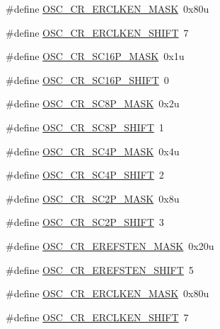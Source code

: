 \begin{DoxyCompactItemize}
\#define \hyperlink{group___o_s_c___register___masks_gab96140627de270278cbdfc81fbef63fc}{O\+S\+C\+\_\+\+C\+R\+\_\+\+E\+R\+C\+L\+K\+E\+N\+\_\+\+M\+A\+SK}~0x80u
\item 
\#define \hyperlink{group___o_s_c___register___masks_ga56f4aa6f215268327accda5434671187}{O\+S\+C\+\_\+\+C\+R\+\_\+\+E\+R\+C\+L\+K\+E\+N\+\_\+\+S\+H\+I\+FT}~7
\item 
\#define \hyperlink{group___o_s_c___register___masks_ga8c73f0e22875a434f8031986a9e5f8b4}{O\+S\+C\+\_\+\+C\+R\+\_\+\+S\+C16\+P\+\_\+\+M\+A\+SK}~0x1u
\item 
\#define \hyperlink{group___o_s_c___register___masks_ga4bcf6535cd7e7c4ff935f6b544ca3f9a}{O\+S\+C\+\_\+\+C\+R\+\_\+\+S\+C16\+P\+\_\+\+S\+H\+I\+FT}~0
\item 
\#define \hyperlink{group___o_s_c___register___masks_ga1a5a0db08efaf66c34caf98136cbec11}{O\+S\+C\+\_\+\+C\+R\+\_\+\+S\+C8\+P\+\_\+\+M\+A\+SK}~0x2u
\item 
\#define \hyperlink{group___o_s_c___register___masks_ga6f17376a1571a200e55cac51d1358503}{O\+S\+C\+\_\+\+C\+R\+\_\+\+S\+C8\+P\+\_\+\+S\+H\+I\+FT}~1
\item 
\#define \hyperlink{group___o_s_c___register___masks_ga18f4104a5a6c0d94f0592ee06732fe03}{O\+S\+C\+\_\+\+C\+R\+\_\+\+S\+C4\+P\+\_\+\+M\+A\+SK}~0x4u
\item 
\#define \hyperlink{group___o_s_c___register___masks_gab1724a5b1e96efb22e48a9478ae8cf25}{O\+S\+C\+\_\+\+C\+R\+\_\+\+S\+C4\+P\+\_\+\+S\+H\+I\+FT}~2
\item 
\#define \hyperlink{group___o_s_c___register___masks_ga94a8b0e48d18793bde1a3aaaea44b92c}{O\+S\+C\+\_\+\+C\+R\+\_\+\+S\+C2\+P\+\_\+\+M\+A\+SK}~0x8u
\item 
\#define \hyperlink{group___o_s_c___register___masks_ga0ec9adaf1ca3ec309f1a2c2fd37d3f4d}{O\+S\+C\+\_\+\+C\+R\+\_\+\+S\+C2\+P\+\_\+\+S\+H\+I\+FT}~3
\item 
\#define \hyperlink{group___o_s_c___register___masks_ga3024913f44011d333c6f48ddb00fbf9d}{O\+S\+C\+\_\+\+C\+R\+\_\+\+E\+R\+E\+F\+S\+T\+E\+N\+\_\+\+M\+A\+SK}~0x20u
\item 
\#define \hyperlink{group___o_s_c___register___masks_gac1b9c5d7f156f1792255204dae816aba}{O\+S\+C\+\_\+\+C\+R\+\_\+\+E\+R\+E\+F\+S\+T\+E\+N\+\_\+\+S\+H\+I\+FT}~5
\item 
\#define \hyperlink{group___o_s_c___register___masks_gab96140627de270278cbdfc81fbef63fc}{O\+S\+C\+\_\+\+C\+R\+\_\+\+E\+R\+C\+L\+K\+E\+N\+\_\+\+M\+A\+SK}~0x80u
\item 
\#define \hyperlink{group___o_s_c___register___masks_ga56f4aa6f215268327accda5434671187}{O\+S\+C\+\_\+\+C\+R\+\_\+\+E\+R\+C\+L\+K\+E\+N\+\_\+\+S\+H\+I\+FT}~7

\end{DoxyCompactItemize}
